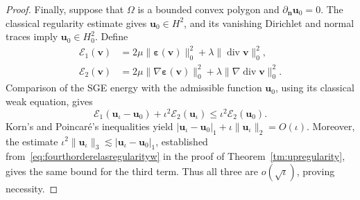 \documentclass[10pt]{amsart}
\renewcommand{\div}{\operatorname{div}}
\numberwithin{equation}{section}
\begin{document}
\begin{proof}
Finally, suppose that $\Omega$ is a bounded convex polygon and $\partial_{\boldsymbol n}\boldsymbol u_0=0$. The classical regularity estimate gives $\boldsymbol u_0\in H^2$, and its vanishing Dirichlet and normal traces imply $\boldsymbol u_0\in H_0^2$. Define
\[
\begin{aligned}
\mathcal E_1(\boldsymbol v)
&=2\mu\|\boldsymbol\varepsilon(\boldsymbol v)\|_0^2+\lambda\|\div\boldsymbol v\|_0^2,\\
\mathcal E_2(\boldsymbol v)
&=2\mu\|\nabla\boldsymbol\varepsilon(\boldsymbol v)\|_0^2+\lambda\|\nabla\div\boldsymbol v\|_0^2.
\end{aligned}
\]
Comparison of the SGE energy with the admissible function $\boldsymbol u_0$, using its classical weak equation, gives
\[
\mathcal E_1(\boldsymbol u_\iota-\boldsymbol u_0)
+\iota^2\mathcal E_2(\boldsymbol u_\iota)
\leq\iota^2\mathcal E_2(\boldsymbol u_0).
\]
Korn's and Poincar\'e's inequalities yield
$|\boldsymbol u_\iota-\boldsymbol u_0|_1+\iota\|\boldsymbol u_\iota\|_2=O(\iota)$.
Moreover, the estimate
$\iota^2\|\boldsymbol u_\iota\|_3\lesssim|\boldsymbol u_\iota-\boldsymbol u_0|_1$,
established from~\eqref{eq:fourthorderelasregularityw} in the proof of Theorem~\ref{tm:upregularity}, gives the same bound for the third term. Thus all three are $o(\sqrt\iota)$, proving necessity.
\end{proof}
\end{document}
